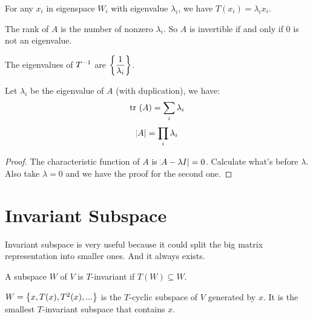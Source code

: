 \begin{theorem}
    For any $x_i$ in eigenspace $W_i$ with eigenvalue $\lambda_i$, we have $T(x_i) = \lambda_i x_i$.
\end{theorem}

\begin{theorem}
    The rank of $A$ is the number of nonzero $\lambda_i$. So $A$ is invertible if and only if $0$ is not an eigenvalue.    
\end{theorem}

\begin{theorem}
    The eigenvalues of ${T}^{-1}$ are $\displaystyle \set{\frac{1}{\lambda_i}}$.
\end{theorem}


\begin{theorem}
    Let $\lambda_i$ be the eigenvalue of $A$ (with duplication), we have:
    \begin{equation}
        \displaystyle \mathrm{tr}~( A ) = \sum_i \lambda_i
    \end{equation}
    \begin{equation}
        \abs{A} = \prod_i \lambda_i
    \end{equation}
\end{theorem}
\begin{proof}
    The characteristic function of $A$ is $\abs{A - \lambda I} = 0$. Calculate what's before $\lambda$. Also take $\lambda=0$ and we have the proof for the second one.
\end{proof}



\section{Invariant Subspace}

Invariant subspace is very useful because it could split the big matrix representation into smaller ones. And it always exists.

\begin{definition}[$T$-invariant]
    A subspace $W$ of $V$ is $T$-invariant if $T(W) \subseteq W$.
\end{definition}

\begin{definition}[$T$-cyclic]
    $W = \set{x, T(x), T^2(x), ...}$ is the $T$-cyclic subspace of $V$ generated by $x$. It is the smallest $T$-invariant subspace that contains $x$.
\end{definition}

